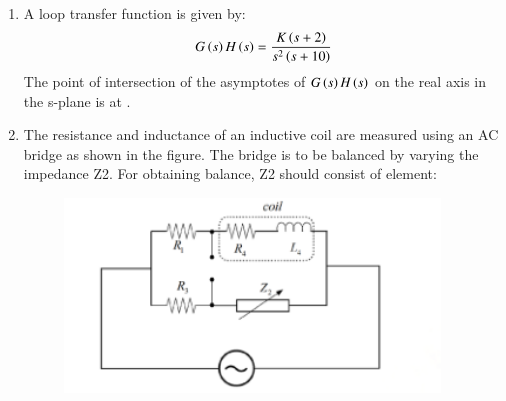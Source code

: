 \documentclass[journal,12pt,onecolumn]{IEEEtran}
\theoremstyle{remark}
\begin{document}
\begin{enumerate}
    \hfill{}
        \begin{enumerate}
        \end{enumerate}
    
    \item A loop transfer function is given by: 
    \begin{align*}
    G\left(s\right)H\left(s\right) = \frac{K\left(s+2\right)}{s^2\left(s+10\right)}   
    \end{align*}
    The point of intersection of the asymptotes of $G\left(s\right)H\left(s\right)$ on the real axis in the s-plane is at \underline{\hspace{2cm}}.

    \hfill{}
    
    \item The resistance and inductance of an inductive coil are measured using an AC bridge as shown in the figure. The bridge is to be balanced by varying the impedance Z2. For obtaining balance, Z2 should consist of element:
    \begin{figure}[H]
        \centering
        \includegraphics[width=0.6\columnwidth]{q22}
        \caption*{}
        \label{fig:q22}
    \end{figure}

    \hfill{}
        \begin{enumerate}
        \end{enumerate}
    

\end{enumerate}
\end{document}
